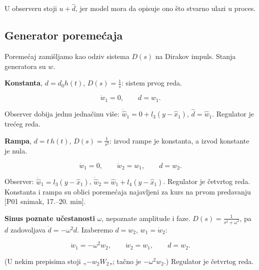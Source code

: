 \documentclass[11pt,a4paper,parskip=half,headsepline,numbers=noenddot]{scrartcl}
\DeclareRobustCommand{\izvor}[1]{{\small\color{izvorC}[#1]}}
\begin{document}
U observeru stoji \(u + \hat d\), jer model mora da opisuje ono što stvarno ulazi u proces.

\subsection{Generator poremećaja}

Poremećaj zamišljamo kao odziv sistema \(D(s)\) na Dirakov impuls. Stanja generatora su \(w\).

\textbf{Konstanta}, \(d = d_0h(t)\), \(D(s) = \frac1s\): sistem prvog reda.

\[\dot w_1 = 0,\qquad d = w_1 .\]

Observer dobija jednu jednačinu više: \(\dot{\hat w}_1 = 0 + l_3(y - \hat x_1)\), \(\hat d = \hat w_1\). Regulator je trećeg reda.

\textbf{Rampa}, \(d = t\,h(t)\), \(D(s) = \frac{1}{s^2}\): izvod rampe je konstanta, a izvod konstante je nula.

\[\dot w_1 = 0,\qquad \dot w_2 = w_1,\qquad d = w_2 .\]

Observer: \(\dot{\hat w}_1 = l_3(y - \hat x_1)\), \(\dot{\hat w}_2 = \hat w_1 + l_4(y - \hat x_1)\). Regulator je četvrtog reda. Konstanta i rampa su oblici poremećaja najavljeni za kurs na prvom predavanju \izvor{P01 snimak, 17.--20. min}.

\textbf{Sinus poznate učestanosti} \(\omega\), nepoznate amplitude i faze. \(D(s) = \frac{1}{s^2 + \omega^2}\), pa \(d\) zadovoljava \(\ddot d = -\omega^2 d\). Izaberemo \(d = w_2\), \(w_1 = \dot w_2\):

\[\dot w_1 = -\omega^2w_2,\qquad \dot w_2 = w_1,\qquad d = w_2 .\]

(U nekim prepisima stoji „\(-w_2W_2\)„; tačno je \(-\omega^2w_2\).) Regulator je četvrtog reda.
\end{document}
